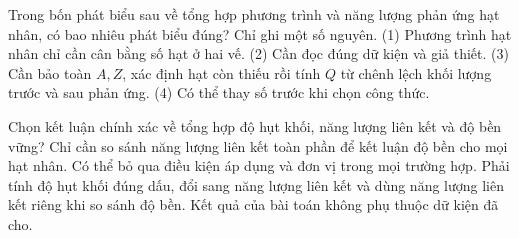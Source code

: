\begin{ex}
Trong bốn phát biểu sau về tổng hợp phương trình và năng lượng phản ứng hạt nhân, có bao nhiêu phát biểu đúng? Chỉ ghi một số nguyên. (1) Phương trình hạt nhân chỉ cần cân bằng số hạt ở hai vế. (2) Cần đọc đúng dữ kiện và giả thiết. (3) Cần bảo toàn $A,Z$, xác định hạt còn thiếu rồi tính $Q$ từ chênh lệch khối lượng trước và sau phản ứng. (4) Có thể thay số trước khi chọn công thức.
\end{ex}

\begin{ex}
Chọn kết luận chính xác về tổng hợp độ hụt khối, năng lượng liên kết và độ bền vững?
\choice
{Chỉ cần so sánh năng lượng liên kết toàn phần để kết luận độ bền cho mọi hạt nhân.}
{Có thể bỏ qua điều kiện áp dụng và đơn vị trong mọi trường hợp.}
{\True Phải tính độ hụt khối đúng dấu, đổi sang năng lượng liên kết và dùng năng lượng liên kết riêng khi so sánh độ bền.}
{Kết quả của bài toán không phụ thuộc dữ kiện đã cho.}
\end{ex}

